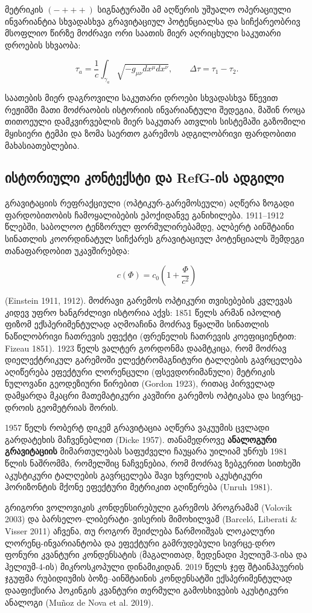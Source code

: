 \documentclass[11pt,a4paper]{article}
\begin{document}
მეტრიკის $(-+++)$ სიგნატურაში ამ აღწერის უშუალო ოპერაციული ინვარიანტია სხვადასხვა გრავიტაციულ პოტენციალსა და სიჩქარეობრივ მსოფლიო წირზე მოძრავი ორი საათის მიერ აღრიცხული საკუთარი დროების სხვაობა:

\[
\tau_a=\frac{1}{c}\int_{\gamma_a}\sqrt{-g_{\mu\nu}dx^\mu dx^\nu},
\qquad
\Delta\tau=\tau_1-\tau_2.
\]

საათების მიერ დაგროვილი საკუთარი დროები სხვადასხვა წნევით რეჟიმში მათი მოძრაობის ისტორიის ინვარიანტული შედეგია, მაშინ როცა თითოეული დამკვირვებლის მიერ საკუთარ ათვლის სისტემაში გაზომილი მყისიერი ტემპი და ზომა საერთო გარემოს ადგილობრივი ფარდობითი მახასიათებლებია.


\subsection{ისტორიული კონტექსტი და RefG-ის ადგილი}

გრავიტაციის რეფრაქციული (ოპტიკურ-გარემოსეული) აღწერა ზოგადი ფარდობითობის ჩამოყალიბების ეპოქიდანვე განიხილება. 1911–1912 წლებში, საბოლოო ტენზორულ ფორმულირებამდე, ალბერტ აინშტაინი სინათლის კოორდინატულ სიჩქარეს გრავიტაციულ პოტენციალს შემდეგი თანაფარდობით უკავშირებდა:

\[
c(\Phi) = c_0 \left(1 + \frac{\Phi}{c^2}\right)
\]

(Einstein 1911, 1912). მოძრავი გარემოს ოპტიკური თვისებების კვლევას კიდევ უფრო ხანგრძლივი ისტორია აქვს: 1851 წელს არმან იპოლიტ ფიზომ ექსპერიმენტულად აღმოაჩინა მოძრავ წყალში სინათლის ნაწილობრივი ჩათრევის ეფექტი (ფრენელის ჩათრევის კოეფიციენტით: Fizeau 1851). 1923 წელს ვალტერ გორდონმა დაამტკიცა, რომ მოძრავ დიელექტრიკულ გარემოში ელექტრომაგნიტური ტალღების გავრცელება აღიწერება ეფექტური ლორენცული (ფსევდორიმანული) მეტრიკის ნულოვანი გეოდეზიური წირებით (Gordon 1923), რითაც პირველად დამყარდა მკაცრი მათემატიკური კავშირი გარემოს ოპტიკასა და სივრცე-დროის გეომეტრიას შორის.

1957 წელს რობერტ დიკემ გრავიტაცია აღწერა ვაკუუმის ცვლადი გარდატეხის მაჩვენებლით (Dicke 1957). თანამედროვე \textbf{ანალოგური გრავიტაციის} მიმართულებას საფუძველი ჩაუყარა უილიამ უნრუს 1981 წლის ნაშრომმა, რომელშიც ნაჩვენებია, რომ მოძრავ ზებგერით სითხეში აკუსტიკური ტალღების გავრცელება შავი ხვრელის აკუსტიკური ჰორიზონტის მქონე ეფექტური მეტრიკით აღიწერება (Unruh 1981).

გრიგორი ვოლოვიკის კონდენსირებული გარემოს პროგრამამ (Volovik 2003) და ბარსელო–ლიბერატი–ვისერის მიმოხილვამ (Barceló, Liberati \& Visser 2011) აჩვენა, თუ როგორ შეიძლება წარმოიშვას ლოკალური ლორენც-ინვარიანტობა და ეფექტური გამრუდებული სივრცე-დრო ფონური კვანტური კონდენსატის (მაგალითად, ზედენადი ჰელიუმ-3-ისა და ჰელიუმ-4-ის) მიკროსკოპული დინამიკიდან. 2019 წელს ჯეფ შტაინჰაუერის ჯგუფმა რუბიდიუმის ბოზე–აინშტაინის კონდენსატში ექსპერიმენტულად დააფიქსირა ჰოკინგის კვანტური თერმული გამოსხივების აკუსტიკური ანალოგი (Muñoz de Nova et al. 2019).
\end{document}
